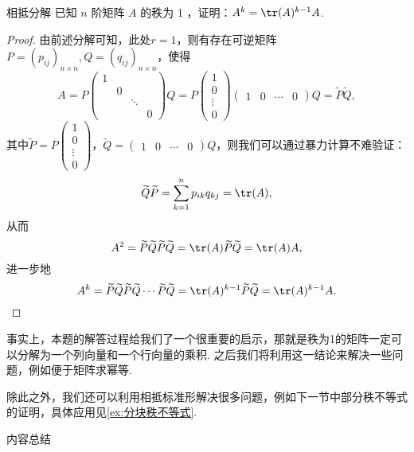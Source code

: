 \begin{example}{}{相抵分解}
    已知 $n$ 阶矩阵 $A$ 的秩为 1 ，证明：$A^k=\tr(A)^{k-1}A$.
\end{example}

\begin{proof}
    由前述分解可知，此处$r=1$，则有存在可逆矩阵 $P=(p_{ij})_{n \times n},Q=(q_{ij})_{n \times n}$，使得
    \[A=P\begin{pmatrix}
            1 &   &        &   \\
              & 0 &        &   \\
              &   & \ddots &   \\
              &   &        & 0
        \end{pmatrix} Q=P\begin{pmatrix}
            1 \\ 0 \\ \vdots \\ 0
        \end{pmatrix}\begin{pmatrix}
            1 & 0 & \cdots & 0
        \end{pmatrix} Q=\widetilde{P} \widetilde{Q},\]
    其中$\widetilde{P}=P\begin{pmatrix}
            1 \\ 0 \\ \vdots \\ 0
        \end{pmatrix}$，$\widetilde{Q}=\begin{pmatrix}
            1 & 0 & \cdots & 0
        \end{pmatrix} Q$，则我们可以通过暴力计算不难验证：
    \[\widetilde{Q} \widetilde{P}=\sum_{k=1}^{n} p_{i k} q_{k j}=\tr(A),\]
    从而
    \[A^{2}=\widetilde{P} \widetilde{Q} \widetilde{P} \widetilde{Q}=\tr(A) \widetilde{P} \widetilde{Q}=\tr(A) A,\]
    进一步地
    \[A^{k}=\widetilde{P} \widetilde{Q} \widetilde{P} \widetilde{Q} \cdots \widetilde{P} \widetilde{Q}=\tr(A)^{k-1} \widetilde{P} \widetilde{Q}=\tr(A)^{k-1} A.\]
\end{proof}

事实上，本题的解答过程给我们了一个很重要的启示，那就是秩为1的矩阵一定可以分解为一个列向量和一个行向量的乘积. 之后我们将利用这一结论来解决一些问题，例如便于矩阵求幂等.

除此之外，我们还可以利用相抵标准形解决很多问题，例如下一节中部分秩不等式的证明，具体应用见\autoref{ex:分块秩不等式}.

\vspace{2ex}
\centerline{\heiti \Large 内容总结}

